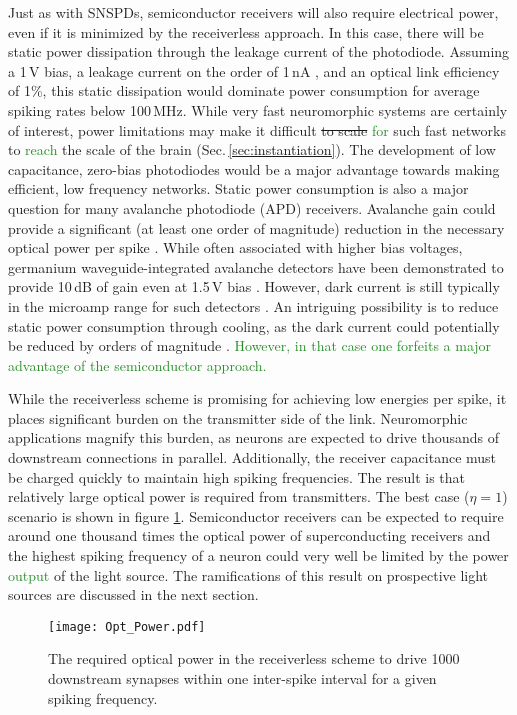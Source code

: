 \documentclass[twocolumn]{article}
\begin{document}
Just as with SNSPDs, semiconductor receivers will also require electrical power, even if it is minimized by the receiverless approach. In this case, there will be static power dissipation through the leakage current of the photodiode. Assuming a 1\,V bias, a leakage current on the order of 1\,nA \cite{zhang2020scalable}, and an optical link efficiency of 1\%, this static dissipation would dominate power consumption for average spiking rates below 100\,MHz. While very fast neuromorphic systems are certainly of interest, power limitations may make it difficult \sout{to scale} \textcolor{ForestGreen}{for} such fast networks to \textcolor{ForestGreen}{reach} the scale of the brain (Sec.\,\ref{sec:instantiation}). The development of low capacitance, zero-bias photodiodes \cite{nozaki2018forward} would be a major advantage towards making efficient, low frequency networks. Static power consumption is also a major question for many avalanche photodiode (APD) receivers. Avalanche gain could provide a significant (at least one order of magnitude) reduction in the necessary optical power per spike \cite{miller2017attojoule}. While often associated with higher bias voltages, germanium waveguide-integrated avalanche detectors have been demonstrated to provide 10\,dB of gain even at 1.5\,V bias \cite{assefa2010reinventing}. However, dark current is still typically in the microamp range for such detectors \cite{assefa2010reinventing,virot2014germanium}. An intriguing possibility is to reduce static power consumption through cooling, as the dark current could potentially be reduced by orders of magnitude \cite{pizzone2020analysis}. \textcolor{ForestGreen}{However, in that case one forfeits a major advantage of the semiconductor approach.}

While the receiverless scheme is promising for achieving low energies per spike, it places significant burden on the transmitter side of the link. Neuromorphic applications magnify this burden, as neurons are expected to drive thousands of downstream connections in parallel. Additionally, the receiver capacitance must be charged quickly to maintain high spiking frequencies. The result is that relatively large optical power is required from transmitters. The best case ($\eta = 1$) scenario is shown in figure \ref{fig:communication}. Semiconductor receivers can be expected to require around one thousand times the optical power of superconducting receivers and the highest spiking frequency of a neuron could very well be limited by the power \textcolor{ForestGreen}{output} of the light source. The ramifications of this result on prospective light sources are discussed in the next section. 
\begin{figure}[h!]
    \centering
    \texttt{[image: Opt\_Power.pdf]}
    \caption{The required optical power in the receiverless scheme to drive 1000 downstream synapses within one inter-spike interval for a given spiking frequency.}
    \label{fig:communication}
\end{figure}
\end{document}
